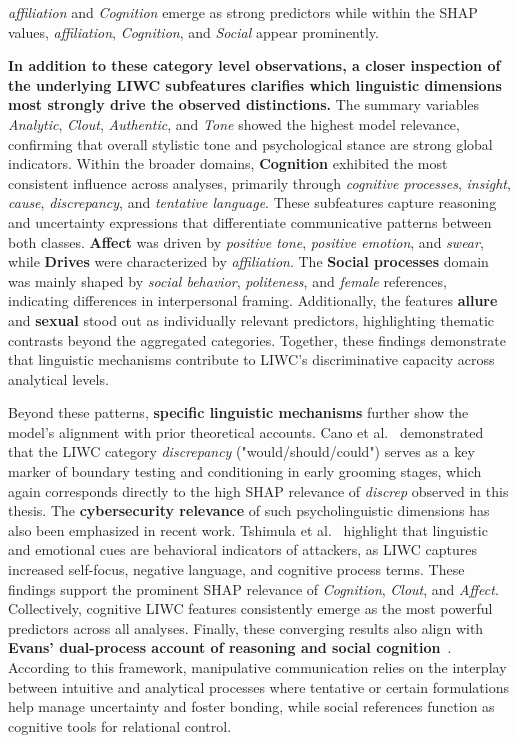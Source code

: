 \textit{affiliation} and \textit{Cognition} emerge as strong predictors while within the SHAP values, \textit{affiliation}, \textit{Cognition}, and \textit{Social} appear prominently. 

\textbf{In addition to these category level observations, a closer inspection of the underlying LIWC subfeatures clarifies which linguistic dimensions most strongly drive the observed distinctions.} The summary variables \textit{Analytic}, \textit{Clout}, \textit{Authentic}, and \textit{Tone} showed the highest model relevance, confirming that overall stylistic tone and psychological stance are strong global indicators. Within the broader domains, \textbf{Cognition} exhibited the most consistent influence across analyses, primarily through \textit{cognitive processes}, \textit{insight}, \textit{cause}, \textit{discrepancy}, and \textit{tentative language}. These subfeatures capture reasoning and uncertainty expressions that differentiate communicative patterns between both classes. \textbf{Affect} was driven by \textit{positive tone}, \textit{positive emotion}, and \textit{swear}, while \textbf{Drives} were characterized by \textit{affiliation}. The \textbf{Social processes} domain was mainly shaped by \textit{social behavior}, \textit{politeness}, and \textit{female} references, indicating differences in interpersonal framing. Additionally, the features \textbf{allure} and \textbf{sexual} stood out as individually relevant predictors, highlighting thematic contrasts beyond the aggregated categories. Together, these findings demonstrate that linguistic mechanisms contribute to LIWC’s discriminative capacity across analytical levels.

Beyond these patterns, \textbf{specific linguistic mechanisms} further show the model’s alignment with prior theoretical accounts. Cano et al.~\cite{Cano2014} demonstrated that the LIWC category \textit{discrepancy} ("would/should/could") serves as a key marker of boundary testing and conditioning in early grooming stages, which again corresponds directly to the high SHAP relevance of \textit{discrep} observed in this thesis. The \textbf{cybersecurity relevance} of such psycholinguistic dimensions has also been emphasized in recent work. Tshimula et al.~\cite{tshimula2024psychologicalprofilingcybersecuritylook} highlight that linguistic and emotional cues are behavioral indicators of attackers, as LIWC captures increased self-focus, negative language, and cognitive process terms. These findings support the prominent SHAP relevance of \textit{Cognition}, \textit{Clout}, and \textit{Affect}. Collectively, cognitive LIWC features consistently emerge as the most powerful predictors across all analyses. Finally, these converging results also align with \textbf{Evans’ dual-process account of reasoning and social cognition}~\cite{evans2025corpus}. According to this framework, manipulative communication relies on the interplay between intuitive and analytical processes where tentative or certain formulations help manage uncertainty and foster bonding, while social references function as cognitive tools for relational control.

